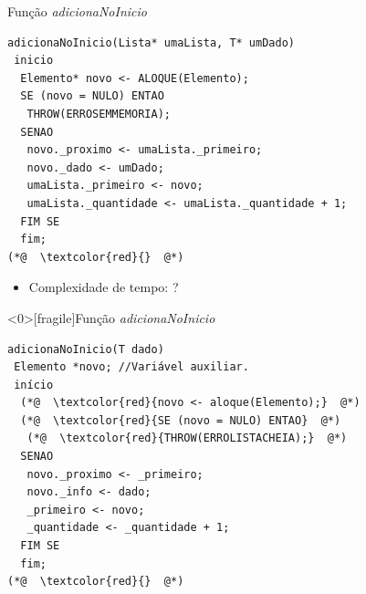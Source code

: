 \documentclass[12pt,table,xcolor={dvipsnames}]{beamer}
\begin{document}
\begin{frame}[fragile]{Função \textit{adicionaNoInicio}}
\begin{lstlisting}
adicionaNoInicio(Lista* umaLista, T* umDado)
 inicio
  Elemento* novo <- ALOQUE(Elemento); 
  SE (novo = NULO) ENTAO
   THROW(ERROSEMMEMORIA);
  SENAO
   novo._proximo <- umaLista._primeiro;
   novo._dado <- umDado;
   umaLista._primeiro <- novo;
   umaLista._quantidade <- umaLista._quantidade + 1;
  FIM SE
  fim;
(*@  \textcolor{red}{}  @*)
\end{lstlisting}
\begin{itemize}
	\item Complexidade de tempo: ?
\end{itemize}
\end{frame}

\begin{frame}<0>[fragile]{Função \textit{adicionaNoInicio}}
\begin{lstlisting}
adicionaNoInicio(T dado)
 Elemento *novo; //Variável auxiliar.
 início
  (*@  \textcolor{red}{novo <- aloque(Elemento);}  @*)
  (*@  \textcolor{red}{SE (novo = NULO) ENTAO}  @*)
   (*@  \textcolor{red}{THROW(ERROLISTACHEIA);}  @*)
  SENAO
   novo._proximo <- _primeiro;
   novo._info <- dado;
   _primeiro <- novo;
   _quantidade <- _quantidade + 1;
  FIM SE
  fim;
(*@  \textcolor{red}{}  @*)
\end{lstlisting}
\end{frame}
\end{document}
